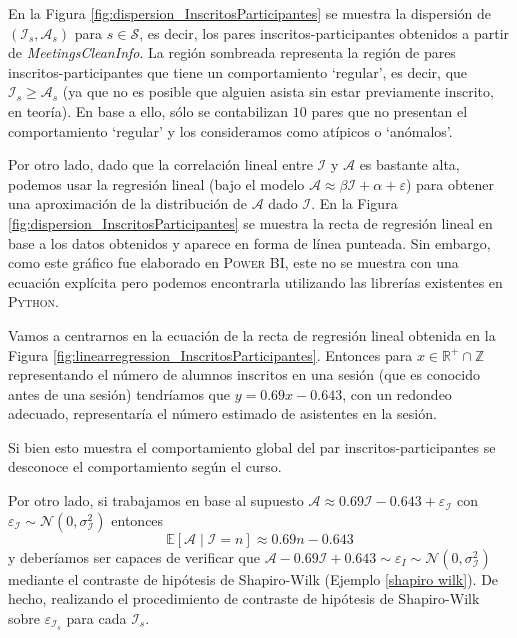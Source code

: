 \documentclass[11pt,a4paper]{book}
\theoremstyle{definition}%
\newcommand{\Real}{\mathbb{R}}
\newcommand{\Integer}{\mathbb{Z}}
\newcommand{\EV}[1]{\mathbb{E}\left[#1\right]}
\begin{document}
                En la Figura \ref{fig:dispersion_InscritosParticipantes} se muestra la dispersión de $(\mathcal{I}_s,\mathcal{A}_s)$ para $s\in\mathcal{S}$, es decir, los pares inscritos-participantes obtenidos a partir de \textit{MeetingsCleanInfo}. La región sombreada representa la región de pares inscritos-participantes que tiene un comportamiento `regular', es decir, que $\mathcal{I}_s\geq \mathcal{A}_s$ (ya que no es posible que alguien asista sin estar previamente inscrito, en teoría). En base a ello, sólo se contabilizan $10$ pares que no presentan el comportamiento `regular' y los consideramos como atípicos o `anómalos'.

                Por otro lado, dado que la correlación lineal entre $\mathcal{I}$ y $\mathcal{A}$ es bastante alta, podemos usar la regresión lineal (bajo el modelo $\mathcal{A}\approx\beta\mathcal{I}+\alpha+\varepsilon$) para obtener una aproximación de la distribución de $\mathcal{A}$ dado $\mathcal{I}$. En la Figura \ref{fig:dispersion_InscritosParticipantes} se muestra la recta de regresión lineal en base a los datos obtenidos y aparece en forma de línea punteada. Sin embargo, como este gráfico fue elaborado en \textsc{Power BI}, este no se muestra con una ecuación explícita pero podemos encontrarla utilizando las librerías existentes en \textsc{Python}.

                Vamos a centrarnos en la ecuación de la recta de regresión lineal obtenida en la Figura \ref{fig:linearregression_InscritosParticipantes}. Entonces para $x\in\Real^+\cap\Integer$ representando el número de alumnos inscritos en una sesión (que es conocido antes de una sesión) tendríamos que $y=0.69x-0.643$, con un redondeo adecuado, representaría el número estimado de asistentes en la sesión.

                Si bien esto muestra el comportamiento global del par inscritos-participantes se desconoce el comportamiento según el curso.

                Por otro lado, si trabajamos en base al supuesto $\mathcal{A}\approx0.69\mathcal{I}-0.643+\varepsilon_\mathcal{I}$ con $\varepsilon_\mathcal{I}\sim\mathcal{N}(0,\sigma_\mathcal{I}^2)$ entonces
                \begin{equation*}
                    \EV{\mathcal{A}\mid \mathcal{I}=n}\approx 0.69n-0.643
                \end{equation*}
                y deberíamos ser capaces de verificar que $\mathcal{A}-0.69\mathcal{I}+0.643\sim\varepsilon_I\sim\mathcal{N}(0,\sigma_\mathcal{I}^2)$ mediante el contraste de hipótesis de Shapiro-Wilk (Ejemplo \ref{shapiro wilk}). De hecho, realizando el procedimiento de contraste de hipótesis de Shapiro-Wilk sobre $\varepsilon_{\mathcal{I}_s}$ para cada $\mathcal{I}_s$.
\end{document}
